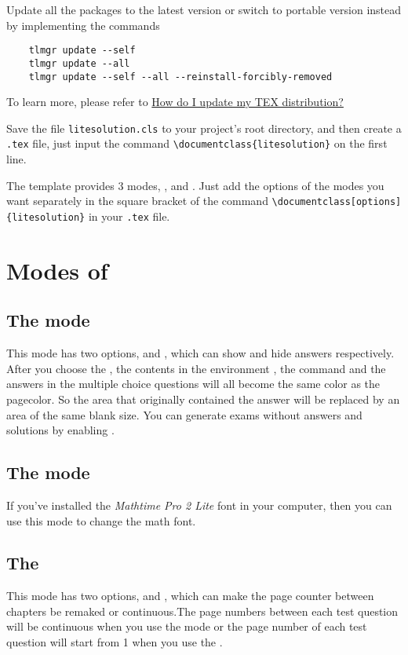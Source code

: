 Update all the packages to the latest version or switch to portable version instead by implementing the commands 
\begin{verbatim}
    tlmgr update --self
    tlmgr update --all
    tlmgr update --self --all --reinstall-forcibly-removed
\end{verbatim}

To learn more, please refer to \href{https://tex.stackexchange.com/questions/55437/how-do-i-update-my-tex-distribution}{How do I update my TEX distribution?}

Save the file \verb|litesolution.cls| to your project's root directory, and then create a \verb|.tex| file, just input the command \verb|\documentclass{litesolution}| on the first line.

The template provides 3 modes, ,  and . Just add the options of the modes you want separately in the square bracket of the command \verb|\documentclass[options]{litesolution}| in your \verb|.tex| file.

\section{Modes of }
\subsection{The  mode}
This mode has two options,  and , which can show and hide answers respectively. After you choose the , the contents in the environment , the command  and the answers in the multiple choice questions will all become the same color as the pagecolor. So the area that originally contained the answer will be replaced by an area of the same blank size. You can generate exams without answers and solutions by enabling .

\subsection{The  mode}
If you've installed the \emph{Mathtime Pro 2 Lite} font in your computer, then you can use this mode to change the math font.

\subsection{The }
This mode has two options,  and , which can make the page counter between chapters be remaked or continuous.The page numbers between each test question will be continuous when you use the  mode or the page number of each test question will start from 1 when you use the .


